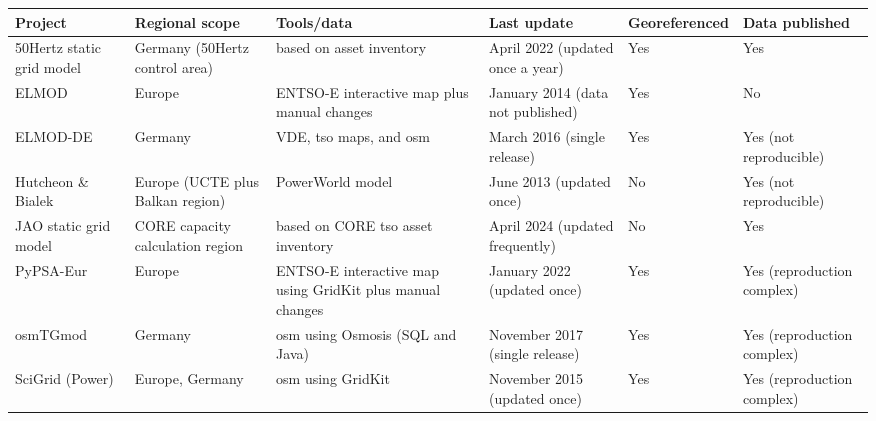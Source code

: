 \documentclass[fleqn,10pt]{wlscirep}
\let\autocite\cite
\begin{document}
\begin{table}[!htbp]
    \centering
    \begin{tabular}{|p{2.5cm}|p{2.6cm}|p{3.5cm}|p{3cm}|p{1.5cm}|p{2cm}|}
    \hline
    \textbf{Project} & \textbf{Regional scope} & \textbf{Tools/data} & \textbf{Last update} & \textbf{Geo\-referenced} & \textbf{Data \newline published} \\
    \hline
    50Hertz static grid model\autocite{50hertzStaticGridModel2022} & Germany (50Hertz control area) & based on asset inventory & April 2022 \newline (updated once a year) & Yes & Yes \\
    \hline
    ELMOD\autocite{egererElectricitySectorData2014} & Europe & ENTSO-E interactive map\autocite{entso-eENTSOETransmissionSystem} plus manual changes & January 2014 \newline (data not published) & Yes & No \\
    \hline
    ELMOD-DE\autocite{egererOpenSourceElectricity2016} & Germany & VDE, \acrshort{tso} maps, and \acrshort{osm} & March 2016
     \newline (single release) & Yes & Yes (not reproducible) \\
    \hline
    Hutcheon \& Bialek\autocite{hutcheonUpdatedValidatedPower2013} & Europe (UCTE plus Balkan region) & PowerWorld model & June 2013 \newline (updated once) &  No & Yes (not reproducible) \\
    \hline
    JAO static grid model\autocite{jaoStaticGridModel2023} & CORE capacity calculation region & based on CORE \acrshort{tso} asset inventory & April 2024 \newline (updated frequently) &  No & Yes \\
    \hline
    PyPSA-Eur\autocite{horschPyPSAEurOpenOptimisation2018} & Europe & ENTSO-E interactive map\autocite{entso-eENTSOETransmissionSystem} using GridKit\autocite{wiegmansGridKitExtractENTSOE2016} plus manual changes& January 2022 \newline (updated once) &  Yes & Yes (reproduction complex) \\
    \hline
    osmTGmod \autocite{OsmTGmodDocumentation2017} & Germany & \acrshort{osm} using Osmosis (SQL and Java)\autocite{wiegmansGridKitExtractENTSOE2016} & November 2017 \newline (single release) &  Yes & Yes (reproduction complex)\\
    \hline
    SciGrid (Power) \autocite{medjroubiOpenDataPower2017} & Europe, Germany & \acrshort{osm} using GridKit\autocite{wiegmansGridKitExtractENTSOE2016} & November 2015 \newline (updated once) & Yes & Yes (reproduction complex)\\

\end{tabular}
\end{table}
\end{document}
